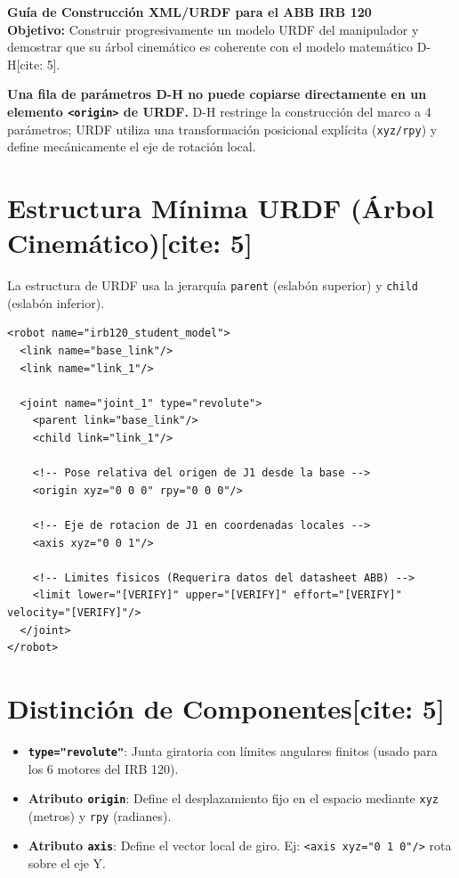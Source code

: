 \documentclass[11pt, a4paper]{article}
\begin{document}
\begin{center}
    \Large\textbf{\textcolor{ucbblue}{Guía de Construcción XML/URDF para el ABB IRB 120}}\\[0.2cm]
    \normalsize \textbf{Objetivo:} Construir progresivamente un modelo URDF del manipulador y demostrar que su árbol cinemático es coherente con el modelo matemático D-H[cite: 5].
\end{center}

\vspace{0.4cm}
\begin{tcolorbox}[colback=red!5, colframe=red!75!black, title=\textbf{Concepto Crítico D-H vs. URDF {[cite: 5]}}]
    \textbf{Una fila de parámetros D-H no puede copiarse directamente en un elemento \texttt{<origin>} de URDF.} D-H restringe la construcción del marco a 4 parámetros; URDF utiliza una transformación posicional explícita (\texttt{xyz/rpy}) y define mecánicamente el eje de rotación local.
\end{tcolorbox}

\section{Estructura Mínima URDF (Árbol Cinemático)[cite: 5]}
La estructura de URDF usa la jerarquía \texttt{parent} (eslabón superior) y \texttt{child} (eslabón inferior).
\begin{lstlisting}
<robot name="irb120_student_model">
  <link name="base_link"/>
  <link name="link_1"/>

  <joint name="joint_1" type="revolute">
    <parent link="base_link"/>
    <child link="link_1"/>
    
    <!-- Pose relativa del origen de J1 desde la base -->
    <origin xyz="0 0 0" rpy="0 0 0"/>
    
    <!-- Eje de rotacion de J1 en coordenadas locales -->
    <axis xyz="0 0 1"/>
    
    <!-- Limites fisicos (Requerira datos del datasheet ABB) -->
    <limit lower="[VERIFY]" upper="[VERIFY]" effort="[VERIFY]" velocity="[VERIFY]"/>
  </joint>
</robot>
\end{lstlisting}

\section{Distinción de Componentes[cite: 5]}
\begin{itemize}
    \item \textbf{\texttt{type="revolute"}}: Junta giratoria con límites angulares finitos (usado para los 6 motores del IRB 120).
    \item \textbf{Atributo \texttt{origin}}: Define el desplazamiento fijo en el espacio mediante \texttt{xyz} (metros) y \texttt{rpy} (radianes).
    \item \textbf{Atributo \texttt{axis}}: Define el vector local de giro. Ej: \texttt{<axis xyz="0 1 0"/>} rota sobre el eje Y.
\end{itemize}
\end{document}
